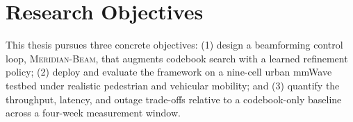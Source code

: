 \section{Research Objectives}
This thesis pursues three concrete objectives: (1) design a beamforming
control loop, \textsc{Meridian-Beam}, that augments codebook search with a
learned refinement policy; (2) deploy and evaluate the framework on a
nine-cell urban mmWave testbed under realistic pedestrian and vehicular
mobility; and (3) quantify the throughput, latency, and outage trade-offs
relative to a codebook-only baseline across a four-week measurement window.
